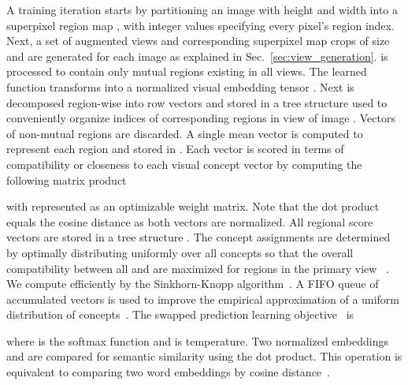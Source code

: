 \documentclass{bmvc2k}
\begin{document}
A training iteration starts by partitioning an image  with height  and width  into a superpixel region map , with integer values specifying every pixel’s region index. Next, a set of  augmented views  and corresponding superpixel map crops  of size  and  are generated for each image as explained in Sec.~\ref{sec:view_generation}.  is processed to contain only mutual regions existing in all views. 
The learned function  transforms  into a normalized visual embedding tensor . Next  is decomposed region-wise into row vectors  and stored in a tree structure  used to conveniently organize indices of corresponding regions  in view  of image . Vectors of non-mutual regions are discarded. A single mean vector  is computed to represent each region  and stored in . Each vector  is scored in terms of compatibility or closeness to each visual concept vector  by computing the following matrix product

\noindent with  represented as an optimizable weight matrix. Note that the dot product  equals the cosine distance as both vectors are normalized. All regional score vectors  are stored in a tree structure . The concept assignments  are determined by optimally distributing  uniformly over all concepts  so that the overall compatibility between all  and  are maximized for regions in the primary view ~\cite{Caron2020SwAV}. We compute  efficiently by the Sinkhorn-Knopp algorithm~\cite{Asano2020SeLA, Cuturi2013OptimalTransport}. A FIFO queue of accumulated  vectors is used to improve the empirical approximation of a uniform distribution of concepts~\cite{Asano2020SeLA, Caron2020SwAV}. The swapped prediction learning objective~\cite{Caron2020SwAV} is

\noindent where  is the softmax function and  is temperature. Two normalized embeddings  and  are compared for semantic similarity using the dot product. This operation is equivalent to comparing two word embeddings by cosine distance~\cite{Mikolov2013DistributedRO, Mikolov2013EffWordRep}.
\end{document}
